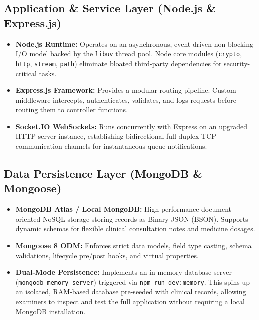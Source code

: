 \documentclass[12pt,a4paper,oneside]{report}
\begin{document}
\subsection{Application \& Service Layer (Node.js \& Express.js)}
\begin{itemize}
    \item \textbf{Node.js Runtime:} Operates on an asynchronous, event-driven non-blocking I/O model backed by the \texttt{libuv} thread pool. Node core modules (\texttt{crypto}, \texttt{http}, \texttt{stream}, \texttt{path}) eliminate bloated third-party dependencies for security-critical tasks.
    \item \textbf{Express.js Framework:} Provides a modular routing pipeline. Custom middleware intercepts, authenticates, validates, and logs requests before routing them to controller functions.
    \item \textbf{Socket.IO WebSockets:} Runs concurrently with Express on an upgraded HTTP server instance, establishing bidirectional full-duplex TCP communication channels for instantaneous queue notifications.
\end{itemize}

\subsection{Data Persistence Layer (MongoDB \& Mongoose)}
\begin{itemize}
    \item \textbf{MongoDB Atlas / Local MongoDB:} High-performance document-oriented NoSQL storage storing records as Binary JSON (BSON). Supports dynamic schemas for flexible clinical consultation notes and medicine dosages.
    \item \textbf{Mongoose 8 ODM:} Enforces strict data models, field type casting, schema validations, lifecycle pre/post hooks, and virtual properties.
    \item \textbf{Dual-Mode Persistence:} Implements an in-memory database server (\texttt{mongodb-memory-server}) triggered via \texttt{npm run dev:memory}. This spins up an isolated, RAM-based database pre-seeded with clinical records, allowing examiners to inspect and test the full application without requiring a local MongoDB installation.
\end{itemize}

\end{document}
